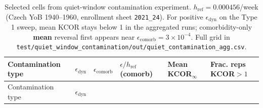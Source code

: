 \documentclass[
]{article}
\begin{document}
\newpage

\begin{longtable}[]{@{}
  >{\raggedright\arraybackslash}p{}
  >{\raggedright\arraybackslash}p{}
  >{\raggedright\arraybackslash}p{}
  >{\raggedright\arraybackslash}p{}
  >{\raggedright\arraybackslash}p{}
  >{\raggedright\arraybackslash}p{}@{}}
\caption{Selected cells from quiet-window contamination experiment.
\(h_{\mathrm{ref}}=0.000456\)/week (Czech YoB 1940--1960, enrollment
sheet \protect\texttt{2021\_24}). For positive
\(\epsilon_{\mathrm{dyn}}\) on the Type 1 sweep, mean KCOR stays below 1
in the aggregated runs; comorbidity-only \textbf{mean} reversal first
appears near \(\epsilon_{\mathrm{comorb}}=3\times10^{-4}\). Full grid in
\protect\texttt{test/quiet\_window\_contamination/out/quiet\_contamination\_agg.csv}.}\label{tbl:quiet_contam}\tabularnewline
\toprule\noalign{}
\begin{minipage}[b]{\linewidth}\raggedright
Contamination type
\end{minipage} & \begin{minipage}[b]{\linewidth}\raggedright
\(\epsilon_{\mathrm{dyn}}\)
\end{minipage} & \begin{minipage}[b]{\linewidth}\raggedright
\(\epsilon_{\mathrm{comorb}}\)
\end{minipage} & \begin{minipage}[b]{\linewidth}\raggedright
\(\epsilon/h_{\mathrm{ref}}\) (comorb)
\end{minipage} & \begin{minipage}[b]{\linewidth}\raggedright
Mean KCOR\(_\infty\)
\end{minipage} & \begin{minipage}[b]{\linewidth}\raggedright
Frac. reps KCOR\(>1\)
\end{minipage} \\
\midrule\noalign{}
\endfirsthead
\toprule\noalign{}
\begin{minipage}[b]{\linewidth}\raggedright
Contamination type
\end{minipage} & \begin{minipage}[b]{\linewidth}\raggedright
\(\epsilon_{\mathrm{dyn}}\)
\end{minipage} & \begin{minipage}[b]{\linewidth}\raggedright

\end{minipage}
\end{longtable}
\end{document}
